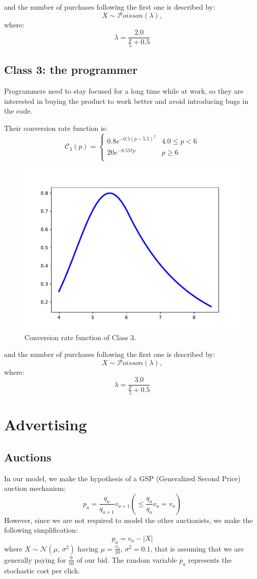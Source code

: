 \documentclass[12pt,a4paper]{report}
\begin{document}
and the number of purchases following the first one is described by: 
\[X \sim  \mathcal{P}oisson   (\lambda),\] where:
\[\lambda = \frac{2.0}{\frac p 5 +0.5}  \]

			\subsection{Class 3: the programmer}
Programmers need to stay focused for a long time while at work, so they are interested in buying the product to work better and avoid introducing bugs in the code.


Their conversion rate function is: \[   \mathcal C_3(p) = \left\{
\begin{array}{ll}
      0.8 e^{-0.5(p-5.5)^2} & 4.0\leq p< 6 \\
      20 e^{-0.557p} & p \geq 6 \\
\end{array} 
\right. \]
\begin{figure}[H]
\centering
  \includegraphics[scale = 0.8, center]{C3}
  \caption{Conversion rate function of Class 3.}
\end{figure}


and the number of purchases following the first one is described by: 
\[X \sim  \mathcal{P}oisson   (\lambda),\] where:
\[\lambda = \frac{3.0}{\frac p 5 +0.5}  \]


		\section{Advertising}

			\subsection{Auctions}
In our model, we make the hypothesis of a GSP (Generalized Second Price) auction mechanism:
	\[p_a= \frac{q_a}{q_{a+1}}v_{a+1} \left( \leq\frac{q_a}{q_a}v_a = v_a\right)\]
However, since we are not required to model the other auctionists, we make the following simplification:
	\[  p_a = v_a - |X|\] 
where $ X\sim \mathcal{N}(\mu,\,\sigma^{2})$ having $\mu = \frac{v_a}{10} ,\,\sigma^{2} = 0.1$,
that is assuming that we are generally paying for $\frac 9 {10}$ of our bid. The random variable $p_a$ represents the stochastic cost per click.
\end{document}
